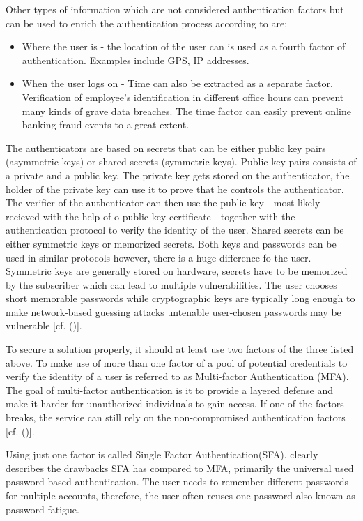  Other types of information which are not considered authentication factors but  can be used to enrich the authentication process according to \citet{Dasgupta:2017:AUA} are:
 
 \begin{itemize}
 	\item Where the user is - the location of the user can is used as a fourth factor of authentication. Examples include GPS, IP addresses.
 	\item When the user logs on - Time can also be extracted as a separate factor. Verification of employee’s identification in different office hours can prevent many kinds of grave data breaches. The time factor can easily prevent online banking fraud events to a great extent. 
 \end{itemize}

The authenticators are based on secrets that can be either public key pairs (asymmetric keys) or shared secrets (symmetric keys). Public key pairs consists of a private and a public key. The private key gets stored on the authenticator, the holder of the private key can use it to prove that he controls the authenticator. The verifier of the authenticator can then use the public key - most likely recieved with the help of o public key certificate - together with the authentication protocol to verify the identity of the user. Shared secrets can be either symmetric keys or memorized secrets. Both keys and passwords can be used in similar protocols however, there is a huge difference fo the user. Symmetric keys are generally stored on hardware, secrets have to be memorized by the subscriber which can lead to multiple vulnerabilities. The user chooses short memorable passwords while cryptographic keys are typically long enough to make network-based guessing attacks untenable user-chosen passwords may be vulnerable [cf. (\cite{NIST:2017:DIG})]. 



To secure a solution properly, it should at least use two factors of the three listed above. To make use of more than one factor of a pool of potential credentials to verify the identity of a user is referred to as Multi-factor Authentication (MFA). The goal of multi-factor authentication is it to provide a layered defense and make it harder for unauthorized individuals to gain access. If one of the factors breaks, the service can still rely on the non-compromised authentication factors [cf. (\citet{Dasgupta:2017:AUA})].

Using just one factor is called Single Factor Authentication(SFA). \cite{Dasgupta:2017:AUA} clearly describes the drawbacks SFA has compared to MFA, primarily the universal used password-based authentication. The user needs to remember different passwords for multiple accounts, therefore, the user often reuses one password also known as password fatigue.

